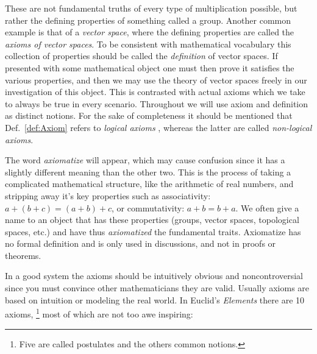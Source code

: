         \par\vspace{2.5ex}
        These are not fundamental truths of every type of multiplication
        possible, but rather the defining properties of something called a
        group. Another common example is that of a \textit{vector space}, where
        the defining properties are called the \textit{axioms of vector spaces}.
        To be consistent with mathematical vocabulary this collection of
        properties should be called the \textit{definition} of vector spaces. If
        presented with some mathematical object one must then prove it
        satisfies the various properties, and then we may use the theory of
        vector spaces freely in our investigation of this object. This is
        contrasted with actual axioms which we take to always be true in every
        scenario. Throughout we will use axiom and definition as distinct
        notions. For the sake of completeness it should be mentioned that
        Def.~\ref{def:Axiom} refers to \textit{logical axioms}%
        , whereas the latter are called
        \textit{non-logical axioms}.
        \par\hfill\par
        The word \textit{axiomatize} will appear, which
        may cause confusion since it has a slightly different meaning than the
        other two. This is the process of taking a complicated mathematical
        structure, like the arithmetic of real numbers, and stripping away it's
        key properties such as associativity: $a+(b+c)=(a+b)+c$, or
        commutativity: $a+b=b+a$. We often give a name to an object that has
        these properties (groups, vector spaces, topological spaces, etc.) and
        have thus \textit{axiomatized} the fundamental traits. Axiomatize has no
        formal definition and is only used in discussions, and not in proofs or
        theorems.
        \par\hfill\par
        In a good system the axioms should be intuitively obvious and
        noncontroversial since you must convince other mathematicians they are
        valid. Usually axioms are based on intuition or modeling the real world.
        In Euclid's \textit{Elements} there are 10
        axioms,%
        \footnote{%
            Five are called postulates and the others common notions.%
        }
        most of which are not too awe inspiring:
